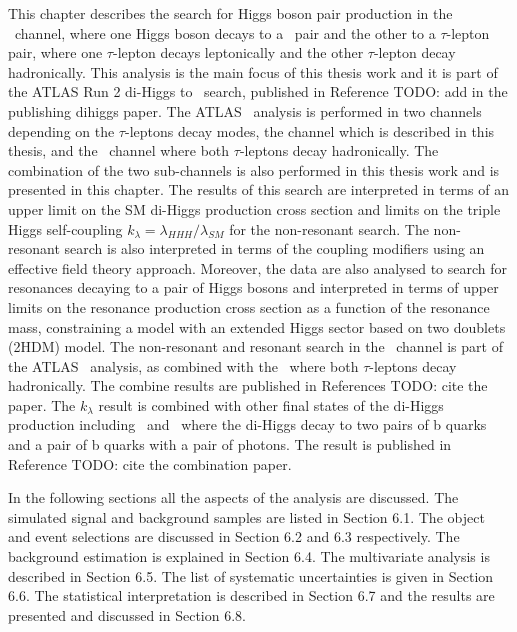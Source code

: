 This chapter describes the search for Higgs boson pair production in the \bbttlh\ channel, 
where one Higgs boson decays to a \bquark\ pair and the other to a $\tau$-lepton pair, where
one $\tau$-lepton decays leptonically and the other $\tau$-lepton decay hadronically.
This analysis is the main focus of this thesis work and it is part of the ATLAS Run 2
di-Higgs to \bbtt\ search, published in Reference TODO: add in the publishing dihiggs paper. 
The ATLAS \bbtt\ analysis is performed in two channels depending on the $\tau$-leptons decay modes,
the \bbttlh channel which is described in this thesis, 
and the \bbtthh\ channel where both $\tau$-leptons decay hadronically. 
The combination of the two sub-channels is also performed 
in this thesis work and is presented in this chapter.
The results of this search are interpreted in terms of an upper limit on the SM di-Higgs production
cross section and limits on the triple Higgs self-coupling $k_\lambda = \lambda_{HHH}/\lambda_{SM}$ 
for the non-resonant search. 
The non-resonant search is also interpreted in terms of the coupling modifiers using an 
effective field theory approach.
Moreover, the data are also analysed to search for resonances decaying to 
a pair of Higgs bosons and interpreted in terms of upper limits on the resonance
production cross section as a function of the resonance mass, 
constraining a model with an extended Higgs sector based on two doublets (2HDM) model.
The non-resonant and resonant search in the \bbttlh\ channel is part of the ATLAS \bbtt\ 
analysis, as combined with the \bbtthh\ where both $\tau$-leptons decay hadronically.
The combine results are published in References TODO: cite the paper.
The $k_\lambda$ result is combined with other final states of the di-Higgs production
including \bbbb\ and \bbyy\ where the di-Higgs decay to two pairs of b quarks and 
a pair of b quarks with a pair of photons. 
The result is published in Reference TODO: cite the combination paper. 

In the following sections all the aspects of the analysis are discussed. The simulated signal and background
samples are listed in Section 6.1. The object and event selections are discussed in Section 6.2 and 6.3
respectively. The background estimation is explained in Section 6.4. The multivariate analysis is
described in Section 6.5. The list of systematic uncertainties is given in Section 6.6. The statistical
interpretation is described in Section 6.7 and the results are presented and discussed in Section 6.8.